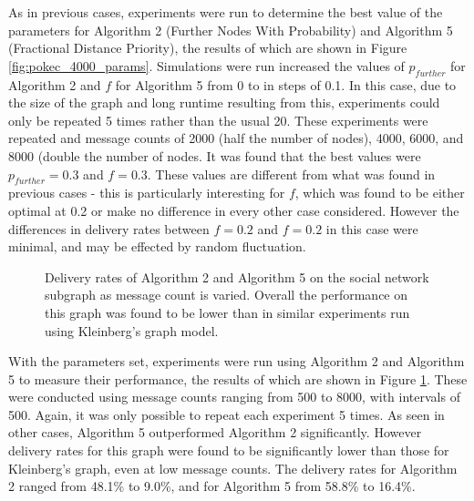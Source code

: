 \documentclass[bsc,frontabs,twoside,singlespacing,parskip,deptreport]{infthesis}     %
\begin{document}
As in previous cases, experiments were run to determine the best value of the parameters for Algorithm 2 (Further Nodes With Probability) and Algorithm 5 (Fractional Distance Priority), the results of which are shown in Figure \ref{fig:pokec_4000_params}. Simulations were run increased the values of $p_{further}$ for Algorithm 2 and $f$ for Algorithm 5 from 0 to in steps of 0.1. In this case, due to the size of the graph and long runtime resulting from this, experiments could only be repeated 5 times rather than the usual 20. These experiments were repeated and message counts of 2000 (half the number of nodes), 4000, 6000, and 8000 (double the number of nodes. It was found that the best values were $p_{further}=0.3$ and $f=0.3$. These values are different from what was found in previous cases - this is particularly interesting for $f$, which was found to be either optimal at 0.2 or make no difference in every other case considered. However the differences in delivery rates between $f=0.2$ and $f=0.2$ in this case were minimal, and may be effected by random fluctuation.

\begin{figure}
\centering
{}
\caption{Delivery rates of Algorithm 2 and Algorithm 5 on the social network subgraph as message count is varied. Overall the performance on this graph was found to be lower than in similar experiments run using Kleinberg's graph model.}
\label{fig:pokec_4000_results}
\end{figure}

With the parameters set, experiments were run using Algorithm 2 and Algorithm 5 to measure their performance, the results of which are shown in Figure \ref{fig:pokec_4000_results}. These were conducted using message counts ranging from 500 to 8000, with intervals of 500. Again, it was only possible to repeat each experiment 5 times. As seen in other cases, Algorithm 5 outperformed Algorithm 2 significantly. However delivery rates for this graph were found to be significantly lower than those for Kleinberg's graph, even at low message counts. The delivery rates for Algorithm 2 ranged from 48.1\% to 9.0\%, and for Algorithm 5 from 58.8\% to 16.4\%.
\end{document}

